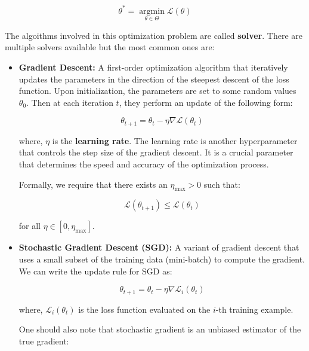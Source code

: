 \begin{equation}
    \theta^* = \operatorname*{argmin}_{\theta \in \Theta} \mathcal{L}(\theta)
    \label{eq:argmin_loss_opt}
\end{equation}

The algoithms involved in this optimization problem are called \textbf{solver}. There are multiple solvers available but the most common ones are:
\begin{itemize}
    \item \textbf{Gradient Descent:} A first-order optimization algorithm that iteratively updates the parameters in the direction of the steepest descent of the loss function.
    Upon initialization, the parameters are set to some random values $\theta_0$. Then at each iteration $t$, they perform an update of the following form:

    \begin{equation}
        \theta_{t+1} = \theta_t - \eta \nabla \mathcal{L}(\theta_t)
        \label{eq:gradient_descent}
    \end{equation}

    where, $\eta$ is the \textbf{learning rate}. The learning rate is another hyperparameter that controls the step size of the gradient descent. It is a crucial parameter that determines the speed and accuracy of the optimization process.

    Formally, we require that there exists an $\eta_{\text{max}} > 0$ such that:

    \begin{equation}
        \mathcal{L}(\theta_{t+1}) \leq \mathcal{L}(\theta_t)
        \label{eq:gradient_descent_bound}
    \end{equation}

    for all $\eta \in [0, \eta_{\text{max}}]$.


    \item \textbf{Stochastic Gradient Descent (SGD):} A variant of gradient descent that uses a small subset of the training data (mini-batch) to compute the gradient.
    We can write the update rule for SGD as:

    \begin{equation}
        \theta_{t+1} = \theta_t - \eta \nabla \mathcal{L}_i (\theta_t)
        \label{eq:sgd}
    \end{equation}

    where, $\mathcal{L}_i (\theta_t)$ is the loss function evaluated on the $i$-th training example.

    One should also note that stochastic gradient is an unbiased estimator of the true gradient:


\end{itemize}
